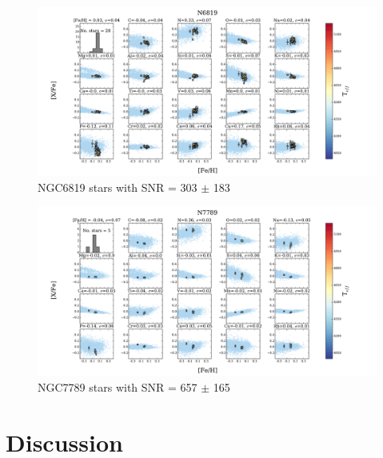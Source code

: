 \documentclass[14pt, preprint2]{aastex6}
\begin{document}
\begin{figure}
\centering
        \includegraphics[scale=0.5]{20elem-2_tc2_nofilt.pdf}
  \caption{ NGC6819 stars with SNR = 303 $\pm$ 183 }
\label{fig:c7}
\end{figure}

\begin{figure}
\centering
  \includegraphics[scale=0.5]{20elem-1_tc2_nofilt.pdf}
  \caption{ NGC7789 stars with SNR = 657 $\pm$ 165 }
\label{fig:c8}
\end{figure}



\section{Discussion}
\end{document}
